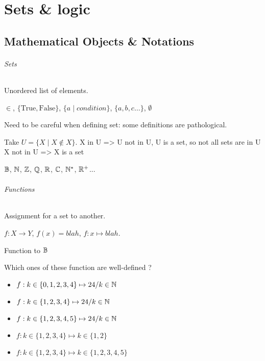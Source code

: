 \chapter{Sets \& logic}

\section{Mathematical Objects \& Notations}
\subparagraph{Sets}
\begin{definition}[Sets]
	Unordered list of elements.
\end{definition}
\begin{notation}[Sets]
	$\in$, $\{ \text{True}, \text{False} \}$, $\{ a \mid condition \}$, $\{ a, b, c \dots \}$, $\emptyset$
\end{notation}
Need to be careful when defining set: some definitions are pathological.
\begin{remark}
	Take $U = \{X \mid X \not\in X\}$.
	X in U => U not in U, U is a set, so not all sets are in U
	X not in U => X is a set
\end{remark}
\begin{notation}
	$\mathbb{B}$, $\mathbb{N}$, $\mathbb{Z}$, $\mathbb{Q}$, $\mathbb{R}$, $\mathbb{C}$, $\mathbb{N}^*$, $\mathbb{R}^+$...
\end{notation}

\subparagraph{Functions}
\begin{definition}[Functions]
	Assignment for a set to another.
\end{definition}
\begin{notation}[Function]
	$f: X \to Y$, $f(x)=blah$, $f: x \mapsto blah$.
\end{notation}
\begin{definition}[Predicate]
	Function to $\mathbb{B}$
\end{definition}
\begin{question}
	Which ones of these function are well-defined ?
	\begin{itemize}
		\item $f:k\in\{0,1,2,3,4\}\mapsto 24/k\in \mathbb{N}$
		\item $f:k\in \{1,2,3,4\}\mapsto 24/k\in \mathbb{N}$
		\item $f:k\in \{1,2,3,4,5\}\mapsto 24/k\in \mathbb{N}$
		\item $f:k\in \{1,2,3,4\}\mapsto k\in \{1,2\}$
		\item $f:k\in \{1,2,3,4\}\mapsto k\in \{1,2,3,4,5\}$
	\end{itemize}
\end{question}

